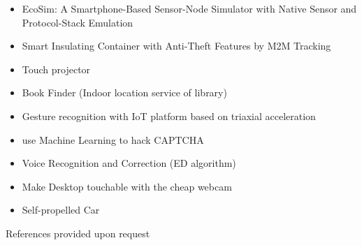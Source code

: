 \documentclass{res}
\begin{document}
\begin{resume}
\begin{itemize}[leftmargin=*]
					\item EcoSim: A Smartphone-Based Sensor-Node Simulator with Native Sensor and Protocol-Stack Emulation
					\vspace{-0.05in}
					
					\item Smart Insulating Container with Anti-Theft Features by M2M Tracking
					\vspace{-0.05in}
					
					\item Touch projector
					\vspace{-0.05in}
					
					\item Book Finder (Indoor location service of library)
					\vspace{-0.05in}
					
					\item Gesture recognition with IoT platform based on triaxial acceleration
					\vspace{-0.05in}
					
					\item use Machine Learning to hack CAPTCHA	
					\vspace{-0.05in}
					
					\item Voice Recognition and Correction (ED algorithm)
					\vspace{-0.05in}
					
					\item Make Desktop touchable with the cheap webcam
					\vspace{-0.05in}	

					\item Self-propelled Car
					\vspace{-0.05in}


			\end{itemize}
			
			\centerline{References provided upon request}
				          
		\end{resume}
	
\end{document}
